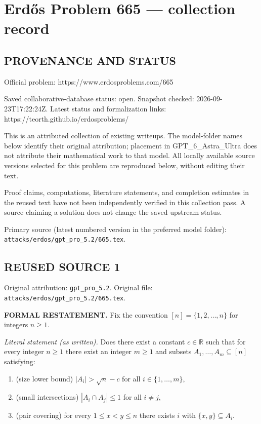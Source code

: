 \section*{Erd\H{o}s Problem 665 --- collection record}

\subsection*{PROVENANCE AND STATUS}
Official problem: https://www.erdosproblems.com/665

Saved collaborative-database status: open.
Snapshot checked: 2026-09-23T17:22:24Z.
Latest status and formalization links: https://teorth.github.io/erdosproblems/

This is an attributed collection of existing writeups. The model-folder names below identify their original attribution; placement in GPT\_6\_Astra\_Ultra does not attribute their mathematical work to that model. All locally available source versions selected for this problem are reproduced below, without editing their text.

Proof claims, computations, literature statements, and completion estimates in the reused text have not been independently verified in this collection pass. A source claiming a solution does not change the saved upstream status.

Primary source (latest numbered version in the preferred model folder): \texttt{attacks/erdos/gpt\_pro\_5.2/665.tex}.

\subsection*{REUSED SOURCE 1}
Original attribution: \texttt{gpt\_pro\_5.2}.
Original file: \texttt{attacks/erdos/gpt\_pro\_5.2/665.tex}.




\noindent\textbf{FORMAL RESTATEMENT.}
Fix the convention $[n]=\{1,2,\dots,n\}$ for integers $n\ge 1$.

\medskip
\noindent\emph{Literal statement (as written).}
Does there exist a constant $c\in\mathbb{R}$ such that for every integer $n\ge 1$ there exist an integer $m\ge 1$ and subsets $A_1,\dots,A_m\subseteq [n]$ satisfying:
\begin{enumerate}
\item (size lower bound) $|A_i|>\sqrt{n}-c$ for all $i\in\{1,\dots,m\}$,
\item (small intersections) $|A_i\cap A_j|\le 1$ for all $i\ne j$,
\item (pair covering) for every $1\le x<y\le n$ there exists $i$ with $\{x,y\}\subseteq A_i$.
\end{enumerate}

